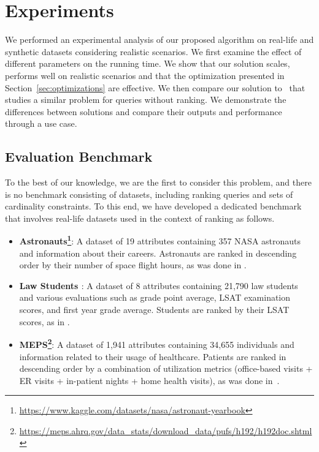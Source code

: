 \section{Experiments}
\label{sec:experiments}


We performed an experimental analysis of our proposed algorithm on real-life and synthetic datasets considering realistic scenarios. We first examine the effect of different parameters on the running time. 
We show that our solution scales, performs well on realistic scenarios and that the optimization presented in Section~\ref{sec:optimizations} are effective. We then compare our solution to~\cite{MLJ22,ERICA} that studies a similar problem for queries without ranking. We demonstrate the differences between solutions and compare their outputs and performance through a use case.
 





\subsection{Evaluation Benchmark}\label{sec:benchmark}
To the best of our knowledge, we are the first to consider this problem, and there is no benchmark consisting of datasets, including ranking queries and sets of cardinality constraints. To this end, we have developed a dedicated benchmark that involves real-life datasets used in the context of ranking as follows. 
\begin{itemize}[leftmargin=1em,labelwidth=*,align=left]
    \item {\bf Astronauts\footnote{\url{https://www.kaggle.com/datasets/nasa/astronaut-yearbook}}}: A dataset of 19 attributes containing 357 NASA astronauts and information about their careers. Astronauts are ranked in descending order by their number of space flight hours, as was done in \cite{SYJ18}.
    \item {\bf Law Students \cite{LawDataOriginal,LawData}}: A dataset of 8 attributes containing 21,790 law students and various evaluations such as grade point average, LSAT examination scores, and first year grade average. Students are ranked by their LSAT scores, as in \cite{ZHW20}.
    \item {\bf MEPS\footnote{\url{https://meps.ahrq.gov/data\_stats/download\_data/pufs/h192/h192doc.shtml}}}: A dataset of 1,941 attributes containing 34,655 individuals and information related to their usage of healthcare. Patients are ranked in descending order by a combination of utilization metrics (office-based visits + ER visits + in-patient nights + home health visits), as was done in~\cite{YGS19}. 
\end{itemize}


